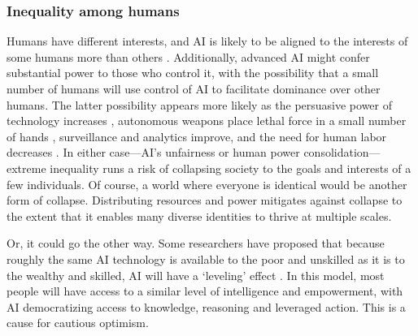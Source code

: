 \documentclass[12pt]{article}
\begin{document}


\subsubsection{Inequality among humans} 

Humans have different interests, and AI is likely to be aligned to the interests of some humans more than others \citep{gabriel2025matter,sorensen2024roadmap,gabriel2020artificial, santurkar2023whose, baum2020social}. Additionally, advanced AI might confer substantial power to those who control it, with the possibility that a small number of humans will use control of AI to facilitate dominance over other humans. The latter possibility appears more likely as the persuasive power of technology increases \citep{woolley2018computational, costello2024durably, hackenburg2025levers}, autonomous weapons place lethal force in a small number of hands \citep{scharre2018army}, surveillance and analytics improve, and the need for human labor decreases \citep{susskind2020world, ford2015rise, drago2025defining}. In either case---AI's unfairness or human power consolidation---extreme inequality runs a risk of collapsing society to the goals and interests of a few individuals. Of course, a world where everyone is identical would be another form of collapse. Distributing resources and power mitigates against collapse to the extent that it enables many diverse identities to thrive at multiple scales.



Or, it could go the other way. Some researchers have proposed that because roughly the same AI technology is available to the poor and unskilled as it is to the wealthy and skilled, AI will have a `leveling' effect \citep{noy2023experimental, brynjolfsson2025generative}. In this model, most people will have access to a similar level of intelligence and empowerment, with AI democratizing access to knowledge, reasoning and leveraged action. This is a cause for cautious optimism.
\end{document}
